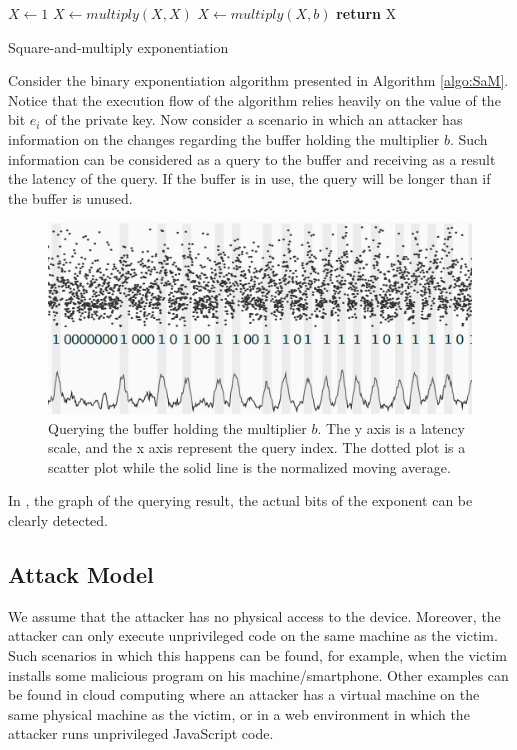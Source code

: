 \begin{algorithm}
        $X \leftarrow 1$  {$X \leftarrow multiply(X,X)$\newline
     {$X \leftarrow multiply(X,b)$}} \textbf{return} X
    \caption{Square-and-multiply exponentiation}
    \label{algo:SaM}
\end{algorithm}

Consider the binary exponentiation algorithm presented in Algorithm
\ref{algo:SaM}. Notice that the execution flow of the algorithm relies heavily
on the value of the bit $e_i$ of the private key. Now consider a scenario in
which an attacker has information on the changes regarding the buffer holding
the multiplier $b$. Such information can be considered as a query to the buffer
and receiving as a result the latency of the query. If the buffer is in use, the
query will be longer than if the buffer is unused.

\begin{figure}
    \centering
    \includegraphics[width=\textwidth]{images/chapter_6/PPSM.PNG}
    \caption{Querying the buffer holding the multiplier $b$. The y axis is a latency scale, and the x axis represent the query index. The dotted plot is a scatter plot while the solid line is the normalized moving average.}
    \label{fig:PPSQ}
\end{figure}

In , the graph of the querying result, the
actual bits of the exponent can be clearly detected.

\subsection{Attack Model}
\label{subsec:attackmodel}
We assume that the attacker has no physical access to the device. Moreover, the
attacker can only execute unprivileged code on the same machine as the victim. Such
scenarios in which this happens can be found, for example, when the victim
installs some malicious program on his machine/smartphone. Other examples can
be found in cloud computing where an attacker has a virtual machine on the same
physical machine as the victim, or in a web environment in which the attacker
runs unprivileged JavaScript code.


